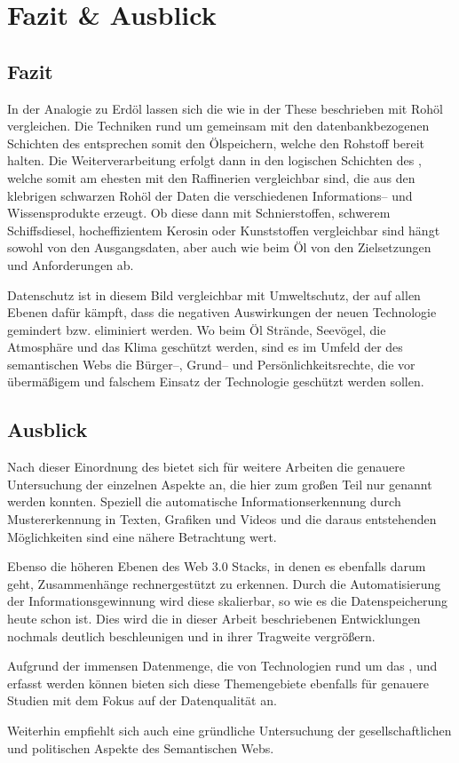 \section{Fazit \& Ausblick}

\subsection{Fazit}

In der Analogie zu Erdöl lassen sich die  wie in der These beschrieben mit Rohöl vergleichen. Die Techniken rund um  gemeinsam mit den datenbankbezogenen Schichten des  entsprechen somit den Ölspeichern, welche den Rohstoff bereit halten. Die Weiterverarbeitung erfolgt dann in den logischen Schichten des , welche somit am ehesten mit den Raffinerien vergleichbar sind, die aus den klebrigen schwarzen Rohöl der Daten die verschiedenen Informations-- und Wissensprodukte erzeugt. Ob diese dann mit Schnierstoffen, schwerem Schiffsdiesel, hocheffizientem Kerosin oder Kunststoffen vergleichbar sind hängt sowohl von den Ausgangsdaten, aber auch wie beim Öl von den Zielsetzungen und Anforderungen ab.

Datenschutz ist in diesem Bild vergleichbar mit Umweltschutz, der auf allen Ebenen dafür kämpft, dass die negativen Auswirkungen der neuen Technologie gemindert bzw. eliminiert werden. Wo beim Öl Strände, Seevögel, die Atmosphäre und das Klima geschützt werden, sind es  im Umfeld der des semantischen Webs die Bürger--, Grund-- und Persönlichkeitsrechte, die vor übermäßigem und falschem Einsatz der Technologie geschützt werden sollen.

\subsection{Ausblick}
\label{ausblick}

Nach dieser Einordnung des  bietet sich für weitere Arbeiten die genauere Untersuchung der einzelnen Aspekte an, die hier zum großen Teil nur genannt werden konnten. Speziell die automatische Informationserkennung durch Mustererkennung in Texten, Grafiken und Videos und die daraus entstehenden Möglichkeiten sind eine nähere Betrachtung wert. 

Ebenso die höheren Ebenen des Web 3.0 Stacks, in denen es ebenfalls darum geht, Zusammenhänge rechnergestützt zu erkennen. Durch die Automatisierung der Informationsgewinnung wird diese skalierbar, so wie es die Datenspeicherung heute schon ist. Dies wird die in dieser Arbeit beschriebenen Entwicklungen nochmals deutlich beschleunigen und in ihrer Tragweite vergrößern. 

Aufgrund der immensen Datenmenge, die von Technologien rund um das ,  und  erfasst werden können bieten sich diese Themengebiete ebenfalls für genauere Studien mit dem Fokus auf der Datenqualität an.

Weiterhin empfiehlt sich auch eine gründliche Untersuchung der gesellschaftlichen und politischen Aspekte des Semantischen Webs.